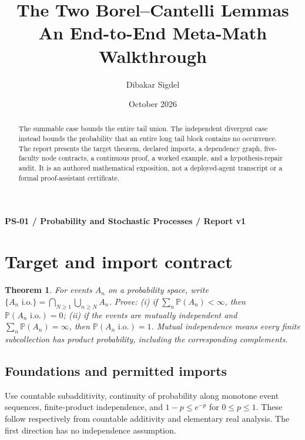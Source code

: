 \documentclass[preprint,12pt,aps,pra,showkeys,amsmath,amssymb,superscriptaddress,floatfix]{revtex4-2}
\newtheorem{theorem}{Theorem}[section]
\theoremstyle{definition}
\theoremstyle{remark}
\begin{document}
\title{The Two Borel--Cantelli Lemmas\\[4pt]\large An End-to-End Meta-Math Walkthrough}

\author{Dibakar Sigdel}


\date{October 2026}

\begin{abstract}

The summable case bounds the entire tail union. The independent
divergent case instead bounds the probability that an entire long tail
block contains no occurrence. The report presents the target theorem,
declared imports, a dependency graph, five-faculty node contracts, a
continuous proof, a worked example, and a hypothesis-repair audit. It is
an authored mathematical exposition, not a deployed-agent transcript or
a formal proof-assistant certificate.

\end{abstract}\maketitle\linespread{1.12}\selectfont

\noindent\textbf{PS-01 / Probability and Stochastic Processes / Report v1}

\section{Target and import contract}

\begin{theorem}

For events \(A_n\) on a probability space, write
\(\{A_n\text{ i.o.}\}=\bigcap_{N\ge1}\bigcup_{n\ge N}A_n\). Prove: (i)
if \(\sum_n\mathbb P(A_n)<\infty\), then
\(\mathbb P(A_n\text{ i.o.})=0\); (ii) if the events are mutually
independent and \(\sum_n\mathbb P(A_n)=\infty\), then
\(\mathbb P(A_n\text{ i.o.})=1\). Mutual independence means every finite
subcollection has product probability, including the corresponding
complements.

\end{theorem}

\subsection{Foundations and permitted imports}

Use countable subadditivity, continuity of probability along monotone
event sequences, finite-product independence, and \(1-p\le e^{-p}\) for
\(0\le p\le1\). These follow respectively from countable additivity and
elementary real analysis. The first direction has no independence
assumption.
\end{document}
